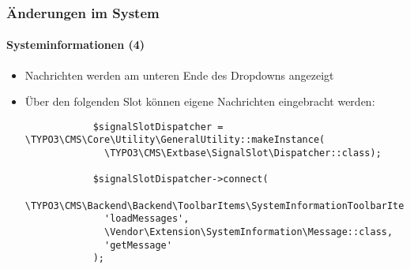 \begin{frame}[fragile]
	\frametitle{Änderungen im System}
	\framesubtitle{Systeminformationen (4)}

	\lstset{basicstyle=\tiny\ttfamily}

	\begin{itemize}
		\item Nachrichten werden am unteren Ende des Dropdowns angezeigt
		\item Über den folgenden Slot können eigene Nachrichten eingebracht werden:

		\begin{lstlisting}
			$signalSlotDispatcher = \TYPO3\CMS\Core\Utility\GeneralUtility::makeInstance(
			  \TYPO3\CMS\Extbase\SignalSlot\Dispatcher::class);

			$signalSlotDispatcher->connect(
			  \TYPO3\CMS\Backend\Backend\ToolbarItems\SystemInformationToolbarItem::class,
			  'loadMessages',
			  \Vendor\Extension\SystemInformation\Message::class,
			  'getMessage'
			);
		\end{lstlisting}

	\end{itemize}

\end{frame}

